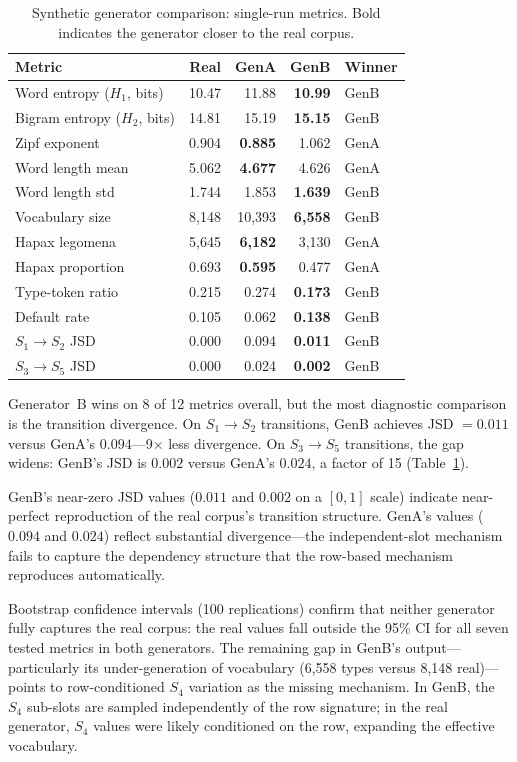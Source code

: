 \documentclass[12pt]{article}
\begin{document}
\begin{table}[ht]
\centering
\caption{Synthetic generator comparison: single-run metrics. Bold indicates the generator closer to the real corpus.}
\label{tab:synthetic}
\begin{tabular}{lrrrl}
\toprule
Metric & Real & GenA & GenB & Winner \\
\midrule
Word entropy ($H_1$, bits) & 10.47 & 11.88 & \textbf{10.99} & GenB \\
Bigram entropy ($H_2$, bits) & 14.81 & 15.19 & \textbf{15.15} & GenB \\
Zipf exponent & 0.904 & \textbf{0.885} & 1.062 & GenA \\
Word length mean & 5.062 & \textbf{4.677} & 4.626 & GenA \\
Word length std & 1.744 & 1.853 & \textbf{1.639} & GenB \\
Vocabulary size & 8{,}148 & 10{,}393 & \textbf{6{,}558} & GenB \\
Hapax legomena & 5{,}645 & \textbf{6{,}182} & 3{,}130 & GenA \\
Hapax proportion & 0.693 & \textbf{0.595} & 0.477 & GenA \\
Type-token ratio & 0.215 & 0.274 & \textbf{0.173} & GenB \\
Default rate & 0.105 & 0.062 & \textbf{0.138} & GenB \\
\midrule
$S_1 \to S_2$ JSD & 0.000 & 0.094 & \textbf{0.011} & GenB \\
$S_3 \to S_5$ JSD & 0.000 & 0.024 & \textbf{0.002} & GenB \\
\bottomrule
\end{tabular}
\end{table}

Generator~B wins on 8 of 12 metrics overall, but the most diagnostic comparison is the transition divergence. On $S_1 \to S_2$ transitions, GenB achieves JSD $= 0.011$ versus GenA's $0.094$---9$\times$ less divergence. On $S_3 \to S_5$ transitions, the gap widens: GenB's JSD is $0.002$ versus GenA's $0.024$, a factor of 15 (Table~\ref{tab:synthetic}).

GenB's near-zero JSD values ($0.011$ and $0.002$ on a $[0,1]$ scale) indicate near-perfect reproduction of the real corpus's transition structure. GenA's values ($0.094$ and $0.024$) reflect substantial divergence---the independent-slot mechanism fails to capture the dependency structure that the row-based mechanism reproduces automatically.

Bootstrap confidence intervals (100 replications) confirm that neither generator fully captures the real corpus: the real values fall outside the 95\% CI for all seven tested metrics in both generators. The remaining gap in GenB's output---particularly its under-generation of vocabulary (6,558 types versus 8,148 real)---points to row-conditioned $S_4$ variation as the missing mechanism. In GenB, the $S_4$ sub-slots are sampled independently of the row signature; in the real generator, $S_4$ values were likely conditioned on the row, expanding the effective vocabulary.
\end{document}
